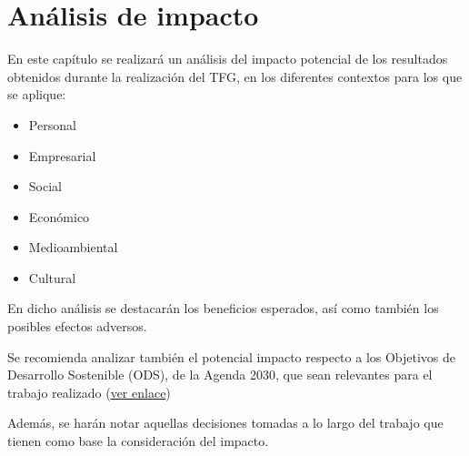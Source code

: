 \chapter{Análisis de impacto}
En este capítulo se realizará un análisis del impacto potencial de los resultados obtenidos durante la realización del TFG, en los diferentes contextos para los que se aplique:

\begin{itemize}
\item Personal
\item Empresarial
\item Social
\item Económico
\item Medioambiental
\item Cultural
\end{itemize}

En dicho análisis se destacarán los beneficios esperados, así como también los posibles efectos adversos.

Se recomienda analizar también el potencial impacto respecto a los Objetivos de Desarrollo Sostenible (ODS), de la Agenda 2030, que sean relevantes para el trabajo realizado (\href{https://www.un.org/sustainabledevelopment/es/objetivos-de-desarrollo-sostenible/}{ver enlace})

Además, se harán notar aquellas decisiones tomadas a lo largo del trabajo que tienen como base la consideración del impacto.
